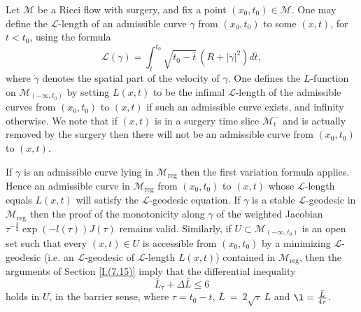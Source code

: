 \documentclass[12pt]{amsart}
\newcommand{\De}{\Delta}
\renewcommand{\L}{{\mathcal L}}
\newcommand{\M}{{\mathcal M}}
\newcommand{\reg}{\operatorname{reg}}
\newcommand{\ga}{\gamma}
\numberwithin{equation}{section}
\theoremstyle{plain}
\theoremstyle{definition}
\theoremstyle{remark}
\begin{document}
Let $\M$ be a Ricci flow with surgery, 
and fix a point $(x_0,t_0)\in\M$.   One may
define the $\L$-length of an  admissible curve $\ga$ from 
$(x_0,t_0)$ to some $(x,t)$, for $t<t_0$, using the formula
\begin{equation}
\L(\ga)=\int_t^{t_0}\sqrt{t_0-\bar t}\,\left(R+|\dot{\ga}|^2\right)d\bar t,
\end{equation}
where $\dot{\ga}$ denotes the spatial part of the velocity of $\ga$.
One defines the $L$-function on $\M_{(-\infty, t_0)}$ by setting
$L(x,t)$ to be the infimal $\L$-length of the admissible curves
from $(x_0,t_0)$ to $(x,t)$ if such an admissible curve exists, and 
infinity otherwise. We note that if $(x,t)$ is in a surgery time slice
$\M_t^-$ and is actually removed by the surgery then there will not be an
admissible curve from $(x_0, t_0)$ to $(x,t)$.

If $\ga$ is an admissible curve lying in $\M_{\reg}$ then 
the first variation formula applies.
Hence an admissible curve in $\M_{\reg}$ from $(x_0, t_0)$ to $(x,t)$
whose ${\mathcal L}$-length
equals $L(x,t)$ will satisfy the ${\mathcal L}$-geodesic 
equation.
If $\ga$ is a stable $\L$-geodesic in $\M_{\reg}$ then 
the proof of the monotonicity along $\ga$ of 
the weighted Jacobian
$\tau^{-\frac{3}{2}}\exp(-l(\tau))J(\tau)$ remains valid.
Similarly, if $U\subset \M_{(-\infty,t_0)}$ is an open set such that
every $(x, t)\in U$ is accessible from $(x_0,t_0)$
by a minimizing $\L$-geodesic (i.e. an $\L$-geodesic of $\L$-length
$L(x,t)$) contained in $\M_{\reg}$, 
then the arguments of Section \ref{I.(7.15)} imply that the 
differential inequality 
\begin{equation} \label{newbarrier}
\bar L_\tau+\De \bar L\leq 6
\end{equation}
holds in $U$, in the barrier sense, where $\tau = t_0 - t$,
$\bar L \: = \: 2 \sqrt{\tau} \: L$ and
$\l = \frac{\bar L}{4\tau}$.
\end{document}
